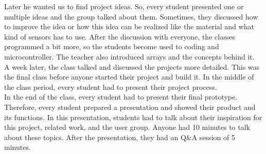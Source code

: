 \documentclass[00_doc.tex]{subfiles}
\begin{document}
\begin{flushleft}
        Later he wanted us to find project ideas. So, every student presented one 
        or multiple ideas and the group talked about them. Sometimes, they discussed how to improve 
        the idea or how this idea can be realized like the material and what kind of sensors has to
        use. After the discussion with everyone, the classes programmed a bit more, so the students become 
        used to coding and microcontroller. The teacher also introduced arrays and the concepts 
        behind it. \\

        A week later, the class talked and discussed the projects more detailed. This was the final class 
        before anyone started their project and build it. In the middle of the class period, every student had 
        to present their project process.  \\

        In the end of the class, every student had to present their final prototype. Therefore, every student 
        prepared a presentation and showed their product and its functions. In this presentation, 
        students had to talk about their inspiration for this project, related work, and the user 
        group. Anyone had 10 minutes to talk about these topics. After the presentation, they had an 
        Q\&A session of 5 minutes.
    \end{flushleft}
\end{document}
